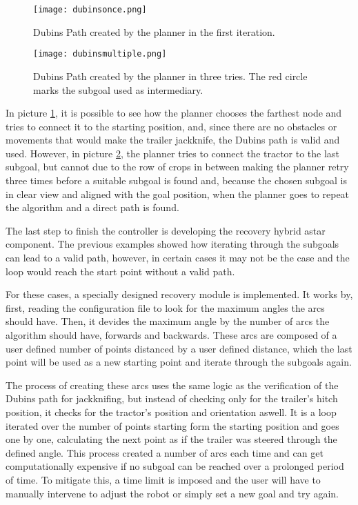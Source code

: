 \begin{figure}[h]
    \centering
    \texttt{[image: dubinsonce.png]}
    \caption{Dubins Path created by the planner in the first iteration.}
    \label{fig:dubins_path1}
\end{figure}
\begin{figure}[h]
    \centering
    \texttt{[image: dubinsmultiple.png]}
    \caption{Dubins Path created by the planner in three tries. The red circle marks the subgoal used as intermediary.}
    \label{fig:dubins_path2}
\end{figure}

In picture \ref{fig:dubins_path1}, it is possible to see how the planner chooses the farthest node and tries 
to connect it to the starting position, and, since there are no obstacles or movements that would make 
the trailer jackknife, the Dubins path is valid and used. However, in picture \ref{fig:dubins_path2}, the 
planner tries to connect the tractor to the last subgoal, but cannot due to the row of crops in between 
making the planner retry three times before a suitable subgoal is found and, because the chosen subgoal 
is in clear view and aligned with the goal position, when the planner goes to repeat the algorithm 
and a direct path is found.

The last step to finish the controller is developing the recovery hybrid astar component. The previous 
examples showed how iterating through the subgoals can lead to a valid path, however, in certain cases 
it may not be the case and the loop would reach the start point without a valid path.

For these cases, a specially designed recovery module is implemented. It works by, first, reading the 
configuration file to look for the maximum angles the arcs should have. Then, it devides the maximum 
angle by the number of arcs the algorithm should have, forwards and backwards. These arcs are composed 
of a user defined number of points distanced by a user defined distance, which the last point will be 
used as a new starting point and iterate through the subgoals again.

The process of creating these arcs uses the same logic as the verification of the Dubins path for 
jackknifing, but instead of checking only for the trailer's hitch position, it checks for the tractor's 
position and orientation aswell. It is a loop iterated over the number of points starting form the starting position 
and goes one by one, calculating the next point as if the trailer was steered through the defined angle. This 
process created a number of arcs each time and can get computationally expensive if no subgoal can 
be reached over a prolonged period of time. To mitigate this, a time limit is imposed and the user will have 
to manually intervene to adjust the robot or simply set a new goal and try again.

